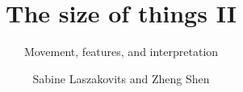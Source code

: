 \title{The size of things II}
\subtitle{Movement, features, and interpretation}
\author{Sabine Laszakovits and Zheng Shen}
\renewcommand{\lsSeries}{ogs}%
\renewcommand{\lsSeriesNumber}{}

%
%

\renewcommand{\lsCoverTitleFont}[1]{%
    \sffamily\addfontfeatures{Scale=MatchUppercase}%
    \fontsize{46pt}{15mm}\selectfont #1}

